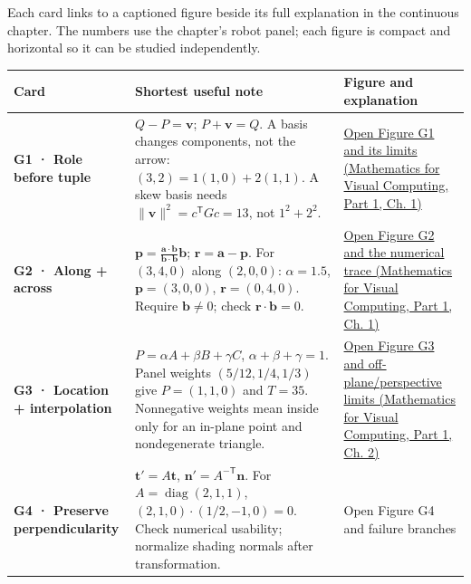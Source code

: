 Each card links to a captioned figure beside its full explanation in the continuous chapter. The numbers use the chapter's robot panel; each figure is compact and horizontal so it can be studied independently.

{\def\LTcaptype{none} %
\begin{longtable}[]{@{}
  >{\raggedright\arraybackslash}p{}
  >{\raggedright\arraybackslash}p{}
  >{\raggedright\arraybackslash}p{}@{}}
\toprule\noalign{}
\begin{minipage}[b]{\linewidth}\raggedright
Card
\end{minipage} & \begin{minipage}[b]{\linewidth}\raggedright
Shortest useful note
\end{minipage} & \begin{minipage}[b]{\linewidth}\raggedright
Figure and explanation
\end{minipage} \\
\midrule\noalign{}
\endhead
\bottomrule\noalign{}
\endlastfoot
\textbf{G1 · Role before tuple} & \(Q-P=\mathbf v\); \(P+\mathbf v=Q\). A basis changes components, not the arrow: \((3,2)=1(1,0)+2(1,1)\). A skew basis needs \(\|\mathbf v\|^2=c^\mathsf TGc=13\), not \(1^2+2^2\). & \href{../02-Mathematics-for-Visual-Computing-P01/main.pdf\#nameddest=01-foundations-i-ch017-g1---one-movement-two-descriptions}{Open Figure G1 and its limits (Mathematics for Visual Computing, Part 1, Ch. 1)} \\
\textbf{G2 · Along + across} & \(\mathbf p=\frac{\mathbf a\cdot\mathbf b}{\mathbf b\cdot\mathbf b}\mathbf b\); \(\mathbf r=\mathbf a-\mathbf p\). For \((3,4,0)\) along \((2,0,0)\): \(\alpha=1.5\), \(\mathbf p=(3,0,0)\), \(\mathbf r=(0,4,0)\). Require \(\mathbf b\ne0\); check \(\mathbf r\cdot\mathbf b=0\). & \href{../02-Mathematics-for-Visual-Computing-P01/main.pdf\#nameddest=01-foundations-i-ch017-g2---split-the-request-into-rail-travel-and-sideways-travel}{Open Figure G2 and the numerical trace (Mathematics for Visual Computing, Part 1, Ch. 1)} \\
\textbf{G3 · Location + interpolation} & \(P=\alpha A+\beta B+\gamma C\), \(\alpha+\beta+\gamma=1\). Panel weights \((5/12,1/4,1/3)\) give \(P=(1,1,0)\) and \(T=35\). Nonnegative weights mean inside only for an in-plane point and nondegenerate triangle. & \href{../02-Mathematics-for-Visual-Computing-P01/main.pdf\#nameddest=01-foundations-i-ch018-g3---reconstruct-a-sensor-location-from-the-corners}{Open Figure G3 and off-plane/perspective limits (Mathematics for Visual Computing, Part 1, Ch. 2)} \\
\textbf{G4 · Preserve perpendicularity} & \(\mathbf t'=A\mathbf t\), \(\mathbf n'=A^{-\mathsf T}\mathbf n\). For \(A=\operatorname{diag}(2,1,1)\), \((2,1,0)\cdot(1/2,-1,0)=0\). Check numerical usability; normalize shading normals after transformation. & {Open Figure G4 and failure branches} \\
\end{longtable}
}

